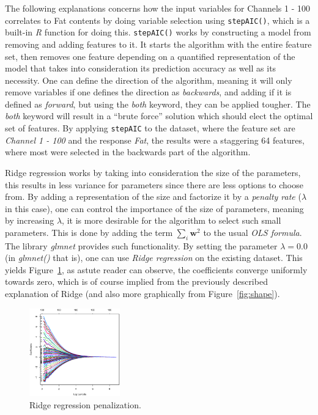 \documentclass[a4paper, twocolumn]{article}
\begin{document}
        The following explanations concerns how the input variables for Channels 1 - 100 correlates to Fat contents by doing variable selection using \texttt{stepAIC()}, which is a built-in \emph{R} function for doing this. \texttt{stepAIC()} works by constructing a model from removing and adding features to it. It starts the algorithm with the entire feature set, then removes one feature depending on a quantified representation of the model that takes into consideration its prediction accuracy as well as its necessity. One can define the direction of the algorithm, meaning it will only remove variables if one defines the direction as \emph{backwards}, and adding if it is defined as \emph{forward}, but using the \emph{both} keyword, they can be applied tougher. The \emph{both} keyword will result in a ``brute force'' solution which should elect the optimal set of features. By applying \texttt{stepAIC} to the dataset, where the feature set are \emph{Channel 1 - 100} and the response \emph{Fat}, the results were a staggering 64 features, where most were selected in the backwards part of the algorithm.

        Ridge regression works by taking into consideration the size of the parameters, this results in less variance for parameters since there are less options to choose from. By adding a representation of the size and factorize it by a \emph{penalty rate} ($\lambda$ in this case), one can control the importance of the size of parameters, meaning by increasing $\lambda$, it is more desirable for the algorithm to select such small parameters. This is done by adding the term $\sum_{i}{\mathbf{w}^2}$ to the usual \emph{OLS formula}. The library \emph{glmnet} provides such functionality. By setting the parameter $\lambda = 0.0$ (in \emph{glmnet()} that is), one can use \emph{Ridge regression} on the existing dataset. This yields Figure~\ref{fig:ridge}, as astute reader can observe, the coefficients converge uniformly towards zero, which is of course implied from the previously described explanation of Ridge (and also more graphically from Figure~\ref{fig:shape}).

    \begin{figure}[h!]
        \centering
        \caption{Ridge regression penalization.}
        \label{fig:ridge}
        \includegraphics[width=0.35\textwidth]{share/ridge.eps}
    \end{figure}
\end{document}
